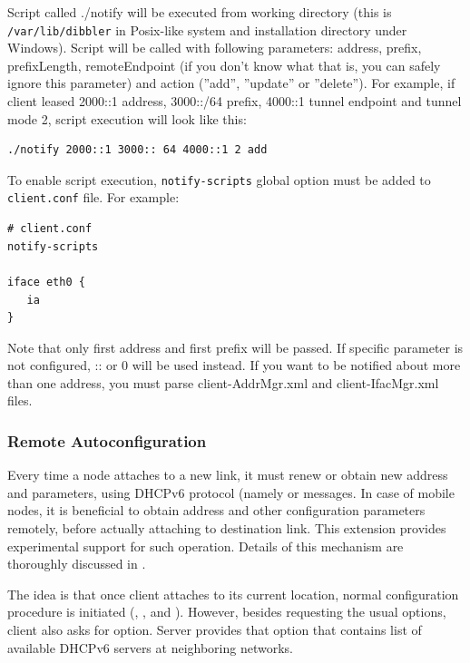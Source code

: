 Script called ./notify will be executed from working directory (this
is \verb+/var/lib/dibbler+ in Posix-like system and
installation directory under Windows). Script will be called with
following parameters: address, prefix, prefixLength, remoteEndpoint
(if you don't know what that is, you can safely ignore this parameter)
and action (''add'', ''update'' or ''delete''). For example, if client
leased 2000::1 address, 3000::/64 prefix, 4000::1 tunnel endpoint
and tunnel mode 2, script execution will look like this:

\begin{lstlisting}
./notify 2000::1 3000:: 64 4000::1 2 add
\end{lstlisting}

To enable script execution, \verb+notify-scripts+ global option must
be added to \verb+client.conf+ file. For example:

\begin{lstlisting}
# client.conf
notify-scripts

iface eth0 {
   ia
}
\end{lstlisting}

Note that only first address and first prefix will be passed. If
specific parameter is not configured, :: or 0 will be used instead. If
you want to be notified about more than one address, you must parse
client-AddrMgr.xml and client-IfacMgr.xml files.

\subsubsection{Remote Autoconfiguration}
\label{features-remote-autoconf}
Every time a node attaches to a new link, it must renew or
obtain new address and parameters, using DHCPv6 protocol (namely 
 or  messages.  In case of mobile nodes, 
it is beneficial to obtain address and other  configuration parameters 
remotely, before actually attaching to destination link.  This
extension provides experimental support for such operation.
Details of this mechanism are thoroughly discussed in \cite{phd,
  draft-remote-autoconf, networks2010, atnac2010}.

The idea is that once client attaches to its current location, normal
configuration procedure is initiated (, ,
 and ). However, besides requesting the usual
options, client also asks for  option. Server provides
that option that contains list of available DHCPv6 servers at
neighboring networks. 

